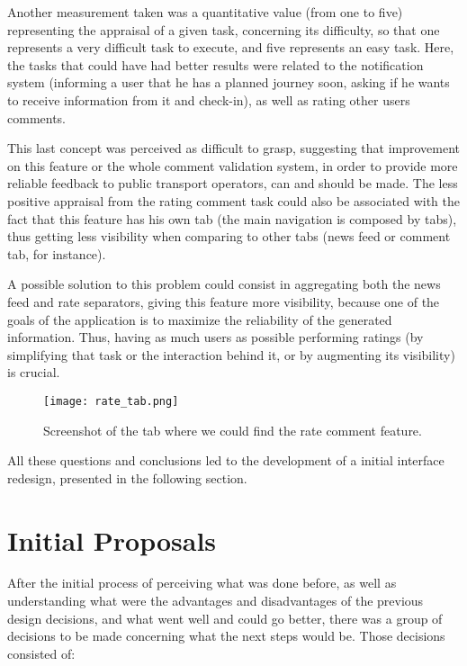 Another measurement taken was a quantitative value (from one to five) representing the appraisal of a given task, concerning its difficulty, so that one represents a very difficult task to execute, and five represents an easy task.
Here, the tasks that could have had better results were related to the notification system (informing a user that he has a planned journey soon, asking if he wants to receive information from it and check-in), as well as rating other users comments. 

This last concept was perceived as difficult to grasp, suggesting that improvement on this feature or the whole comment validation system, in order to provide more reliable feedback to public transport operators, can and should be made.
The less positive appraisal from the rating comment task could also be associated with the fact that this feature has his own tab (the main navigation is composed by tabs), thus getting less visibility when comparing to other tabs (news feed or comment tab, for instance). 

A possible solution to this problem could consist in aggregating both the news feed and rate separators, giving this feature more visibility, because one of the goals of the application is to maximize the reliability of the generated information. Thus, having as much users as possible performing ratings (by simplifying that task or the interaction behind it, or by augmenting its visibility) is crucial.

\begin{figure}[h!]
  \begin{center}
    \leavevmode
    \texttt{[image: rate\_tab.png]}
    \caption{Screenshot of the tab where we could find the rate comment feature.}
    \label{fig:rate_tab}
  \end{center}
\end{figure}

\pagebreak

All these questions and conclusions led to the development of a initial interface redesign, presented in the following section.

\section{Initial Proposals}\label{sec:initial}

After the initial process of perceiving what was done before, as well as understanding what were the advantages and disadvantages of the previous design decisions, and what went well and could go better, there was a group of decisions to be made concerning what the next steps would be. Those decisions consisted of:

